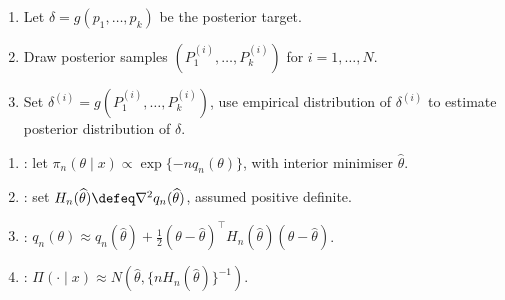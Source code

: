 \begin{method} \label{method:posterior-function-simulation} 
\begin{enumerate}[label=(\roman*)]
\setlength{\itemsep}{0pt}
\item Let $\delta=g(p_1,\ldots,p_k)$ be the posterior target.
\item Draw posterior samples $(P_1^{(i)},\ldots,P_k^{(i)})$ for $i=1,\ldots,N$.
\item Set $\delta^{(i)}=g(P_1^{(i)},\ldots,P_k^{(i)})$, use empirical distribution of $\delta^{(i)}$ to estimate posterior distribution of $\delta$.
\end{enumerate}
\end{method}

\begin{method} \label{meth:laplace-approximation-posterior} 
\begin{enumerate}[label=(\roman*)]
\setlength{\itemsep}{0pt}
\item {}: let $\pi_n(\theta\mid x)\propto\exp\{-nq_n(\theta)\}$, with interior minimiser $\widehat{\theta}$.
\item {}: set $H_n(\widehat{\theta})\defeq\nabla^2q_n(\widehat{\theta})$, assumed positive definite.
\item {}: $q_n(\theta)\approx q_n(\widehat{\theta})+\frac12(\theta-\widehat{\theta})^\top H_n(\widehat{\theta})(\theta-\widehat{\theta})$.
\item {}: $\Pi(\cdot\mid x)\approx N(\widehat{\theta},\{nH_n(\widehat{\theta})\}^{-1})$.
\end{enumerate}
\end{method}

